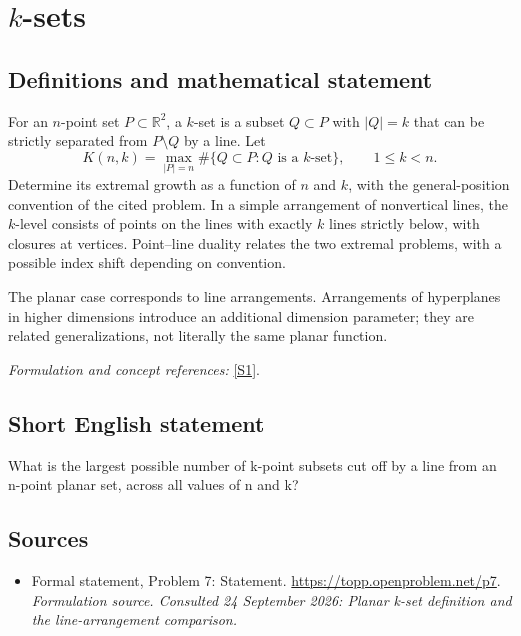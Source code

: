 \documentclass[11pt]{article}
\begin{document}
\section*{\texorpdfstring{$k$-sets}{\$k\$-sets}}\label{statement}
\subsection{Definitions and mathematical statement}
For an $n$-point set $P\subset{\mathbb{R}}^2$, a $k$-set is a subset $Q\subset P$ with $|Q|=k$ that can be strictly separated from $P\setminus Q$ by a line. Let
\[
 K(n,k)=\max_{|P|=n}\#\{Q\subset P:Q\text{ is a }k\text{-set}
                                      \},\qquad1\le k<n.
\]
Determine its extremal growth as a function of $n$ and $k$, with the general-position convention of the cited problem. In a simple arrangement of nonvertical lines, the $k$-level consists of points on the lines with exactly $k$ lines strictly below, with closures at vertices. Point--line duality relates the two extremal problems, with a possible index shift depending on convention.

The planar case corresponds to line arrangements. Arrangements of hyperplanes in higher dimensions introduce an additional dimension parameter; they are related generalizations, not literally the same planar function.
\par\smallskip\textit{Formulation and concept references:} \href{https://topp.openproblem.net/p7}{[S1]}.

\subsection{Short English statement}
What is the largest possible number of k-point subsets cut off by a line from an n-point planar set, across all values of n and k?
\subsection{Sources}
\begin{itemize}
\item[S1]Formal statement, Problem 7: Statement.
\url{https://topp.openproblem.net/p7}.
\textit{Formulation source. Consulted 24 September 2026: Planar k-set definition and the line-arrangement comparison.}
\end{itemize}
\end{document}
